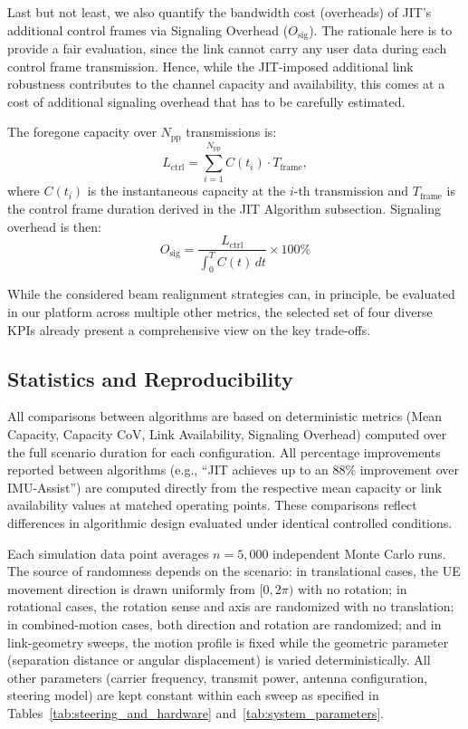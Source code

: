\documentclass[fleqn,10pt]{wlscirep}
\begin{document}
Last but not least, we also quantify the bandwidth cost (overheads) of JIT's additional control frames via Signaling Overhead ($O_{\text{sig}}$). The rationale here is to provide a fair evaluation, since the link cannot carry any user data during each control frame transmission. Hence, while the JIT-imposed additional link robustness contributes to the channel capacity and availability, this comes at a cost of additional signaling overhead that has to be carefully estimated.

The foregone capacity over $N_{\text{pp}}$ transmissions is:
\begin{equation}
    L_{\text{ctrl}} = \sum_{i=1}^{N_{\text{pp}}} C(t_i) \cdot T_{\text{frame}},
\end{equation}
where $C(t_i)$ is the instantaneous capacity at the $i$-th transmission and $T_{\text{frame}}$ is the control frame duration derived in the JIT Algorithm subsection. Signaling overhead is then:
\begin{equation}
    O_{\text{sig}} = \frac{L_{\text{ctrl}}}{\int_{0}^{T} C(t) \, dt} \times 100\%
\end{equation}

While the considered beam realignment strategies can, in principle, be evaluated in our platform across multiple other metrics, the selected set of four diverse KPIs already present a comprehensive view on the key trade-offs.

\subsection*{Statistics and Reproducibility}
All comparisons between algorithms are based on deterministic metrics (Mean Capacity, Capacity CoV, Link Availability, Signaling Overhead) computed over the full scenario duration for each configuration. All percentage improvements reported between algorithms (e.g., ``JIT achieves up to an 88\% improvement over IMU-Assist'') are computed directly from the respective mean capacity or link availability values at matched operating points. These comparisons reflect differences in algorithmic design evaluated under identical controlled conditions.

Each simulation data point averages $n = 5{,}000$ independent Monte Carlo runs. The source of randomness depends on the scenario: in translational cases, the UE movement direction is drawn uniformly from $[0, 2\pi)$ with no rotation; in rotational cases, the rotation sense and axis are randomized with no translation; in combined-motion cases, both direction and rotation are randomized; and in link-geometry sweeps, the motion profile is fixed while the geometric parameter (separation distance or angular displacement) is varied deterministically. All other parameters (carrier frequency, transmit power, antenna configuration, steering model) are kept constant within each sweep as specified in Tables~\ref{tab:steering_and_hardware} and~\ref{tab:system_parameters}.
\end{document}
